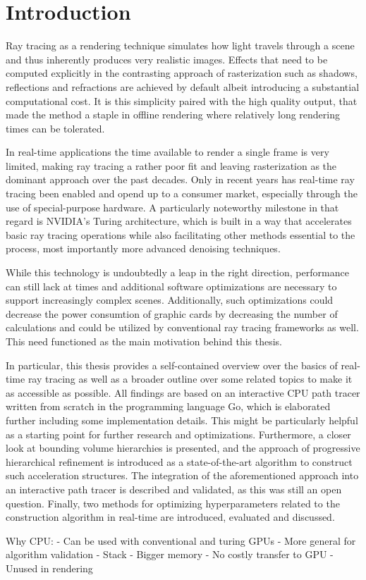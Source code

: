 \section{Introduction}
Ray tracing as a rendering technique simulates how light travels through a scene and thus inherently produces very realistic images. Effects that need to be computed explicitly in the contrasting approach of rasterization such as shadows, reflections and refractions are achieved by default albeit introducing a substantial computational cost. It is this simplicity paired with the high quality output, that made the method a staple in offline rendering where relatively long rendering times can be tolerated.

In real-time applications the time available to render a single frame is very limited, making ray tracing a rather poor fit and leaving rasterization as the dominant approach over the past decades. Only in recent years has real-time ray tracing been enabled and opend up to a consumer market, especially through the use of special-purpose hardware. A particularly noteworthy milestone in that regard is NVIDIA's Turing architecture\cite{nvidia2017turing}, which is built in a way that accelerates basic ray tracing operations while also facilitating other methods essential to the process, most importantly more advanced denoising techniques. 

While this technology is undoubtedly a leap in the right direction, performance can still lack at times and additional software optimizations are necessary to support increasingly complex scenes. Additionally, such optimizations could decrease the power consumtion of graphic cards by decreasing the number of calculations and could be utilized by conventional ray tracing frameworks as well. This need functioned as the main motivation behind this thesis.

In particular, this thesis provides a self-contained overview over the basics of real-time ray tracing as well as a broader outline over some related topics to make it as accessible as possible. All findings are based on an interactive CPU path tracer written from scratch in the programming language Go, which is elaborated further including some implementation details. This might be particularly helpful as a starting point for further research and optimizations. Furthermore, a closer look at bounding volume hierarchies is presented, and the approach of progressive hierarchical refinement\cite{hendrich_parallel_2017} is introduced as a state-of-the-art algorithm to construct such acceleration structures. The integration of the aforementioned approach into an interactive path tracer is described and validated, as this was still an open question. Finally, two methods for optimizing hyperparameters related to the construction algorithm in real-time are introduced, evaluated and discussed.


Why CPU:
- Can be used with conventional and turing GPUs 
- More general for algorithm validation
- Stack
- Bigger memory 
- No costly transfer to GPU 
- Unused in rendering 